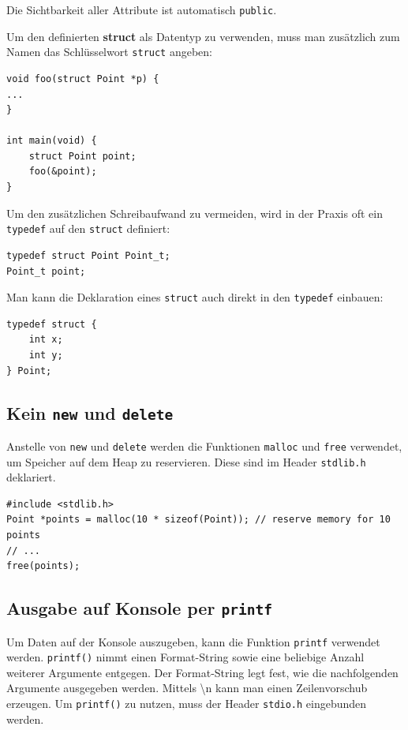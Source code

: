 Die Sichtbarkeit aller Attribute ist automatisch \texttt{public}.

Um den definierten \textbf{struct} als Datentyp zu verwenden, muss man zusätzlich zum Namen das Schlüsselwort \texttt{struct} angeben:

\begin{lstlisting}
void foo(struct Point *p) {
...
}

int main(void) {
	struct Point point;
	foo(&point);
}
\end{lstlisting}

Um den zusätzlichen Schreibaufwand zu vermeiden, wird in der Praxis oft ein \texttt{typedef} auf den \texttt{struct} definiert:

\begin{lstlisting}
typedef struct Point Point_t;
Point_t point;
\end{lstlisting}

Man kann die Deklaration eines \texttt{struct} auch direkt in den \texttt{typedef} einbauen:

\begin{lstlisting}
typedef struct {
	int x;
	int y;
} Point;
\end{lstlisting}

\subsection{Kein \texttt{new} und \texttt{delete}}

Anstelle von \texttt{new} und \texttt{delete} werden die Funktionen \texttt{malloc} und \texttt{free} verwendet, um Speicher auf dem Heap zu reservieren.
Diese sind im Header \texttt{stdlib.h} deklariert.

\begin{lstlisting}
#include <stdlib.h>
Point *points = malloc(10 * sizeof(Point)); // reserve memory for 10 points
// ...
free(points);
\end{lstlisting}

\subsection{Ausgabe auf Konsole per \texttt{printf}}

Um Daten auf der Konsole auszugeben, kann die Funktion \texttt{printf} verwendet werden.
\texttt{printf()} nimmt einen Format-String sowie eine beliebige Anzahl weiterer Argumente entgegen.
Der Format-String legt fest, wie die nachfolgenden Argumente ausgegeben werden.
Mittels \textbackslash n kann man einen Zeilenvorschub erzeugen. Um \texttt{printf()} zu nutzen, muss der Header \texttt{stdio.h} eingebunden werden.

